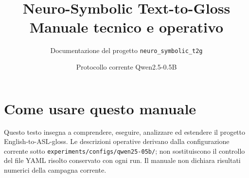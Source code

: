 \documentclass[11pt,a4paper,oneside]{book}
\title{Neuro-Symbolic Text-to-Gloss\\Manuale tecnico e operativo}
\author{Documentazione del progetto \texttt{neuro\_symbolic\_t2g}}
\date{Protocollo corrente Qwen2.5-0.5B}
\newcommand{\pathcode}[1]{\nolinkurl{#1}}
\begin{document}
\frontmatter
\hypersetup{pageanchor=false}
\maketitle
\cleardoublepage
\hypersetup{pageanchor=true}
\chapter*{Come usare questo manuale}
Questo testo insegna a comprendere, eseguire, analizzare ed estendere il progetto English-to-ASL-gloss. Le descrizioni operative derivano dalla configurazione corrente sotto \pathcode{experiments/configs/qwen25-05b/}; non sostituiscono il controllo del file YAML risolto conservato con ogni run. Il manuale non dichiara risultati numerici della campagna corrente.
\tableofcontents
\mainmatter















\appendix

\backmatter


\end{document}
